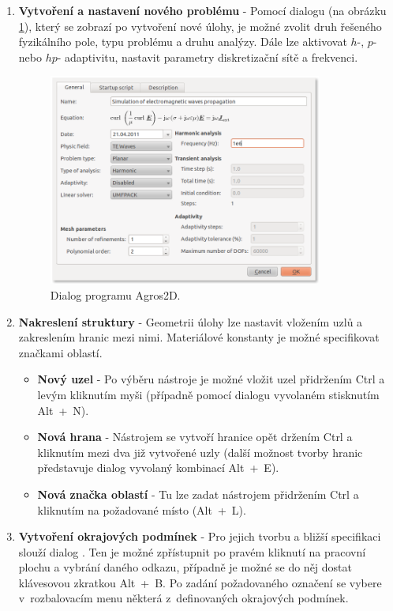 \begin{enumerate}
\item {\bf Vytvoření a nastavení nového problému} - Pomocí dialogu  (na obrázku \ref{obr:sim_problem_properties}), který se zobrazí po vytvoření nové úlohy, je možné zvolit druh řešeného fyzikálního pole, typu problému a druhu analýzy. Dále lze aktivovat $h$-, $p$- nebo $hp$- adaptivitu, nastavit parametry diskretizační sítě a frekvenci.
\begin{figure}[!h]
	\centering
	\includegraphics[width=9cm]{sim_problem_properties.png}
	\caption{Dialog  programu Agros2D.}
	\label{obr:sim_problem_properties}
\end{figure}
\item {\bf Nakreslení struktury} - Geometrii úlohy lze nastavit vložením uzlů a zakreslením hranic mezi nimi. Materiálové konstanty je možné specifikovat značkami oblastí.
\begin{itemize}
\item {\bf Nový uzel} - Po výběru nástroje  je možné vložit uzel přidržením Ctrl a levým kliknutím myši (případně pomocí dialogu vyvolaném stisknutím \mbox{Alt + N}).
\item {\bf Nová hrana} - Nástrojem  se vytvoří hranice opět držením Ctrl a kliknutím mezi dva již vytvořené uzly (další možnost tvorby hranic představuje dialog vyvolaný kombinací \mbox{Alt + E}).
\item {\bf Nová značka oblastí} - Tu lze zadat nástrojem  přidržením Ctrl a kliknutím na požadované místo (\mbox{Alt + L}).
\end{itemize}
\item {\bf Vytvoření okrajových podmínek} - Pro jejich tvorbu a bližší specifikaci slouží dialog . Ten je možné zpřístupnit po pravém kliknutí na pracovní plochu a vybrání daného odkazu, případně je možné se do něj dostat klávesovou zkratkou \mbox{Alt + B}. Po zadání požadovaného označení se vybere v~rozbalovacím menu některá z~definovaných okrajových podmínek.


\end{enumerate}
